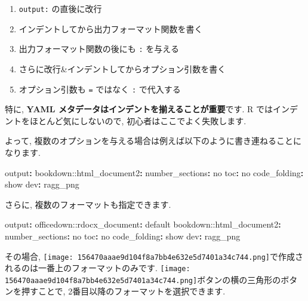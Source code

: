 \documentclass[
]{ltjsarticle}
\newenvironment{Shaded}{\begin{snugshade}}{\end{snugshade}}
\newcommand{\AttributeTok}[1]{\textcolor[rgb]{0.77,0.63,0.00}{#1}}
\newcommand{\CharTok}[1]{\textcolor[rgb]{0.31,0.60,0.02}{#1}}
\newcommand{\FunctionTok}[1]{\textcolor[rgb]{0.00,0.00,0.00}{#1}}
\newcommand{\KeywordTok}[1]{\textcolor[rgb]{0.13,0.29,0.53}{\textbf{#1}}}
\providecommand{\tightlist}{%
  \setlength{\itemsep}{0pt}\setlength{\parskip}{0pt}}
\begin{document}
\begin{enumerate}
\def\labelenumi{\arabic{enumi}.}
\tightlist
\item
  \texttt{output:} の直後に改行
\item
  インデントしてから出力フォーマット関数を書く
\item
  出力フォーマット関数の後にも \texttt{:} を与える
\item
  さらに改行\&インデントしてからオプション引数を書く
\item
  オプション引数も \texttt{=} ではなく \texttt{:} で代入する
\end{enumerate}

特に, \textbf{YAML メタデータはインデントを揃えることが重要}です. R ではインデントをほとんど気にしないので, 初心者はここでよく失敗します.

よって, 複数のオプションを与える場合は例えば以下のように書き連ねることになります.

\begin{Shaded}
\begin{Highlighting}[]
\FunctionTok{output}\KeywordTok{:}
\AttributeTok{  bookdown:}\FunctionTok{:html\_document2}\KeywordTok{:}
\AttributeTok{    }\FunctionTok{number\_sections}\KeywordTok{:}\AttributeTok{ }\CharTok{no}
\AttributeTok{    }\FunctionTok{toc}\KeywordTok{:}\AttributeTok{ }\CharTok{no}
\AttributeTok{    }\FunctionTok{code\_folding}\KeywordTok{:}\AttributeTok{ show}
\AttributeTok{    }\FunctionTok{dev}\KeywordTok{:}\AttributeTok{ ragg\_png}
\end{Highlighting}
\end{Shaded}

さらに, 複数のフォーマットも指定できます.

\begin{Shaded}
\begin{Highlighting}[]
\FunctionTok{output}\KeywordTok{:}
\AttributeTok{  officedown:}\FunctionTok{:rdocx\_document}\KeywordTok{:}\AttributeTok{ default}
\AttributeTok{  bookdown:}\FunctionTok{:html\_document2}\KeywordTok{:}
\AttributeTok{    }\FunctionTok{number\_sections}\KeywordTok{:}\AttributeTok{ }\CharTok{no}
\AttributeTok{    }\FunctionTok{toc}\KeywordTok{:}\AttributeTok{ }\CharTok{no}
\AttributeTok{    }\FunctionTok{code\_folding}\KeywordTok{:}\AttributeTok{ show}
\AttributeTok{    }\FunctionTok{dev}\KeywordTok{:}\AttributeTok{ ragg\_png}
\end{Highlighting}
\end{Shaded}

その場合, \texttt{[image: 156470aaae9d104f8a7bb4e632e5d7401a34c744.png]}で作成されるのは一番上のフォーマットのみです. \texttt{[image: 156470aaae9d104f8a7bb4e632e5d7401a34c744.png]}ボタンの横の三角形のボタンを押すことで, 2番目以降のフォーマットを選択できます.
\end{document}
